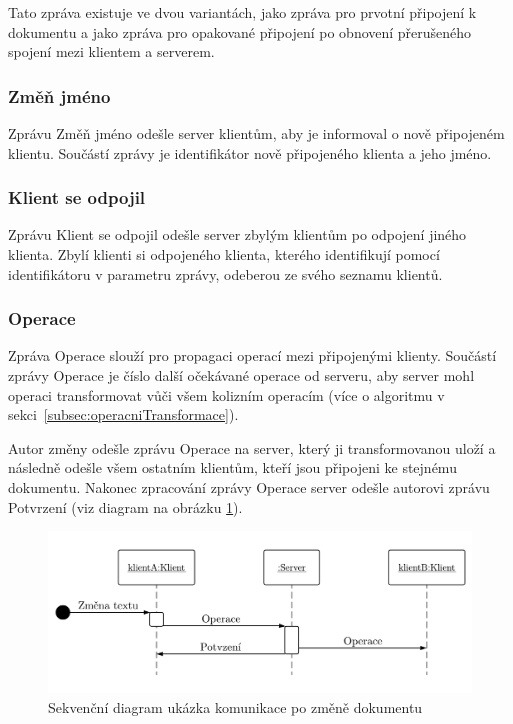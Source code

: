 Tato zpráva existuje ve dvou variantách, jako zpráva pro prvotní připojení k dokumentu a jako zpráva pro opakované připojení po obnovení přerušeného spojení mezi klientem a serverem.

\subsubsection{Změň jméno} %

Zprávu Změň jméno odešle server klientům, aby je informoval o nově připojeném klientu.
Součástí zprávy je identifikátor nově připojeného klienta a jeho jméno.

\subsubsection{Klient se odpojil} %

Zprávu Klient se odpojil odešle server zbylým klientům po odpojení jiného klienta.
Zbylí klienti si odpojeného klienta, kterého identifikují pomocí identifikátoru v parametru zprávy, odeberou ze svého seznamu klientů.

\subsubsection{Operace} %

Zpráva Operace slouží pro propagaci operací mezi připojenými klienty.
Součástí zprávy Operace je číslo další očekávané operace od serveru, aby server mohl operaci transformovat vůči všem kolizním operacím (více o algoritmu v sekci~\ref{subsec:operacniTransformace}).

Autor změny odešle zprávu Operace na server, který ji transformovanou uloží a následně odešle všem ostatním klientům, kteří jsou připojeni ke stejnému dokumentu.
Nakonec zpracování zprávy Operace server odešle autorovi zprávu Potvrzení (viz diagram na obrázku \ref{fig:ukazkaKomunikaceVeSkutečnémČase}).

\begin{figure}[ht!]
    \centering
    \includegraphics[width=\textwidth]{partials/navrh/ukazkaKomunikaceVeSkutečnémČase.pdf}
    \caption{Sekvenční diagram ukázka komunikace po změně dokumentu}\label{fig:ukazkaKomunikaceVeSkutečnémČase}
\end{figure}

